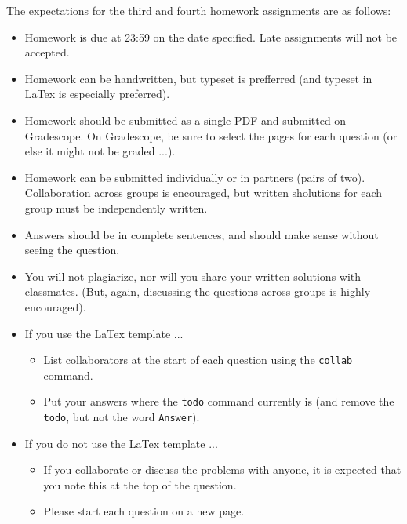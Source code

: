 The expectations for the third and fourth homework assignments are as follows:
\begin{itemize}
    \item Homework is due at 23:59 on the date specified.  Late assignments will
        not be accepted.
    \item Homework can be handwritten, but typeset is prefferred (and typeset in
        LaTex is especially preferred).
    \item Homework should be submitted as a single PDF and submitted on
        Gradescope.  On Gradescope, be sure to select the pages for each
        question (or else it might not be graded ...).
    \item Homework can be submitted individually or in partners (pairs of two).
        Collaboration across groups is encouraged, but written sholutions for
        each group must be independently written.
    \item Answers should be in complete sentences, and should make sense without
        seeing the question.
    \item You will not plagiarize, nor will you share your written solutions
        with classmates.  (But, again, discussing the questions across groups is highly encouraged).
    \item If you use the LaTex template ...
        \begin{itemize}
            \item List collaborators at the start of each question using the \texttt{collab} command.
            \item Put your answers where the \texttt{todo} command currently is (and
                remove the \texttt{todo}, but not the word \texttt{Answer}).
        \end{itemize}
    \item If you do not use the LaTex template ...
        \begin{itemize}
            \item If you collaborate or discuss the problems with anyone, it is
                expected that you note this at the top of the question.
            \item Please start each question on a new page.
        \end{itemize}
\end{itemize}
